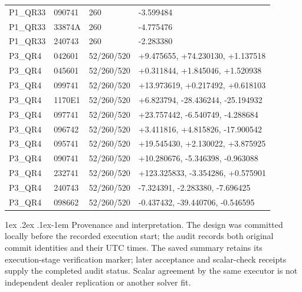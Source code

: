 \documentclass[10pt,a4paper]{article}
\makeatletter
\renewcommand\paragraph{\@startsection{paragraph}{4}{\z@}%
  {1ex \@plus .2ex \@minus .1ex}{-1em}%
  {\normalfont\normalsize\bfseries}}
\makeatother
\begin{document}
\begin{longtable}{lllp{7.5cm}}
P1\_QR33 & 090741 & 260 & -3.599484\\

P1\_QR33 & 33874A & 260 & -4.775476\\

P1\_QR33 & 240743 & 260 & -2.283380\\

P3\_QR4 & 042601 & 52/260/520 & +9.475655, +74.230130, +1.137518\\

P3\_QR4 & 045601 & 52/260/520 & +0.311844, +1.845046, +1.520938\\

P3\_QR4 & 099741 & 52/260/520 & +13.973619, +0.217492, +0.618103\\

P3\_QR4 & 1170E1 & 52/260/520 & +6.823794, -28.436244, -25.194932\\

P3\_QR4 & 097741 & 52/260/520 & +23.757442, -6.540749, -4.288684\\

P3\_QR4 & 096742 & 52/260/520 & +3.411816, +4.815826, -17.900542\\

P3\_QR4 & 095741 & 52/260/520 & +19.545430, +2.130022, +3.875925\\

P3\_QR4 & 090741 & 52/260/520 & +10.280676, -5.346398, -0.963088\\

P3\_QR4 & 232741 & 52/260/520 & +123.325833, -3.354286, +0.575901\\

P3\_QR4 & 240743 & 52/260/520 & -7.324391, -2.283380, -7.696425\\

P3\_QR4 & 098662 & 52/260/520 & -0.437432, -39.440706, -0.546595\\

\bottomrule\end{longtable}

\paragraph{Provenance and interpretation.} The design was committed locally before the recorded execution start; the audit records both original commit identities and their UTC times. The saved summary retains its execution-stage verification marker; later acceptance and scalar-check receipts supply the completed audit status. Scalar agreement by the same executor is not independent dealer replication or another solver fit.
\end{document}
